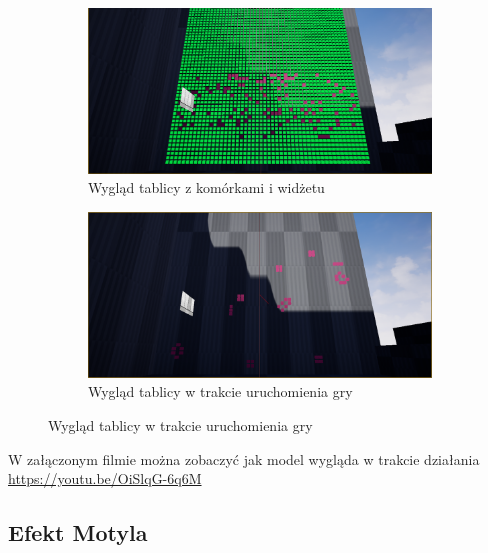 \documentclass[a4paper,12pt,reqno]{article}
\begin{document}
\begin{figure}[H]%
	\centering
	\begin{subfigure}{.5\textwidth}
		\centering
		\includegraphics[width=0.9\linewidth]{graphics/gameoflife/GOLInUE_1.png}
		\caption{Wygląd tablicy z komórkami i widżetu}	
		\label{ref:subref_a}
	\end{subfigure}%
	\begin{subfigure}{.5\textwidth}
		\centering
		\includegraphics[width=0.9\linewidth]{graphics/gameoflife/GOLInUE_2.png}
		\caption{Wygląd tablicy w trakcie uruchomienia gry}
		\label{ref:subref_b}
	\end{subfigure}%
\label{ref:ref}
\end{figure}

W załączonym filmie można zobaczyć jak model wygląda w trakcie działania \url{https://youtu.be/OiSlqG-6q6M}


\subsection{Efekt Motyla}
\end{document}
